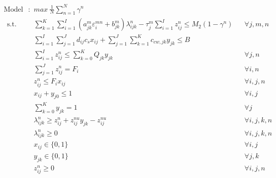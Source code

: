 \documentclass[preprint,12pt,authoryear]{elsarticle}
\begin{document}
\setcounter{equation}{0}
\begin{align}%
	\text{Model S1}:~~&max ~ \frac{1}{N}\sum_{n=1}^N \gamma^n \nonumber \\~~
	\mbox{s.t.}~~
	&\sum_{k=1}^K \sum_{i=1}^I (a_{jk}^m \varepsilon_i^{mn} + b_{jk}^m) \lambda_{ijk}^n - \tau_j^m \sum_{i=1}^I z_{ij}^n \leq M_2 (1-\gamma^n) && \forall j,m,n \label{constraint:treatments1}\\	
	&\sum_{i=1}^{I}\sum_{j=1}^{J}d_{ij}c_s x_{ij} + \sum_{j=1}^{J}\sum_{k=1}^{K}c_{cw,jk}y_{jk} \leq B && \\
 	&\sum_{i=1}^{I} z_{ij}^n \leq \sum_{k=0}^K Q_{jk} y_{jk} && \forall j,n\\
	&\sum_{j=1}^J z_{ij}^n = F_i && \forall i,n\\
	&z_{ij}^n \leq F_i x_{ij} && \forall i,j,n\\
	&x_{ij} + y_{j0} \leq 1 && \forall i,j\\
	&\sum_{k=0}^{K}y_{jk} = 1&&\forall j\\
	&\lambda_{ijk}^n \geq z_{ij}^n + z_{ij}^{nu} y_{jk} - z_{ij}^{nu} && \forall i,j,k,n\\
	&\lambda_{ijk}^n \geq 0 && \forall i,j,k,n\\
	&x_{ij} \in \{0,1\}&&\forall i,j\\
	&y_{jk} \in \{0,1\}&&\forall j,k\\
	&z_{ij}^n \geq 0&&\forall i,j,n
\end{align}
\renewcommand{\theequation}{\thesection--\arabic{equation}}

\newpage
\end{document}
